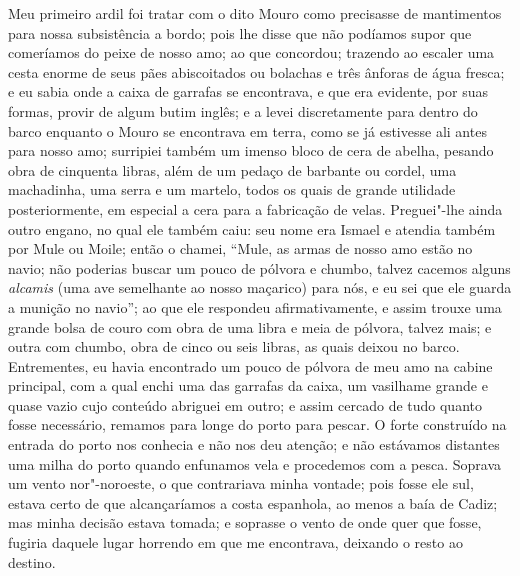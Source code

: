 Meu primeiro ardil foi tratar com o dito Mouro como precisasse de
mantimentos para nossa subsistência a bordo; pois lhe disse que não
podíamos supor que comeríamos do peixe de nosso amo; ao que concordou;
trazendo ao escaler uma cesta enorme de seus pães abiscoitados ou
bolachas e três ânforas de água fresca; e eu sabia onde a caixa de
garrafas se encontrava, e que era evidente, por suas formas, provir de
algum butim inglês; e a levei discretamente para dentro do barco
enquanto o Mouro se encontrava em terra, como se já estivesse ali antes
para nosso amo; surripiei também um imenso bloco de cera de abelha,
pesando obra de cinquenta libras, além de um pedaço de barbante ou
cordel, uma machadinha, uma serra e um martelo, todos os quais de grande
utilidade posteriormente, em especial a cera para a fabricação de velas.
Preguei"-lhe ainda outro engano, no qual ele também caiu: seu nome era
Ismael e atendia também por Mule ou Moile; então o chamei, ``Mule, as
armas de nosso amo estão no navio; não poderias buscar um pouco de
pólvora e chumbo, talvez cacemos alguns \emph{alcamis} (uma ave
semelhante ao nosso maçarico) para nós, e eu sei que ele guarda a
munição no navio''; ao que ele respondeu afirmativamente, e assim trouxe
uma grande bolsa de couro com obra de uma libra e meia de pólvora,
talvez mais; e outra com chumbo, obra de cinco ou seis libras, as quais
deixou no barco. Entrementes, eu havia encontrado um pouco de pólvora de
meu amo na cabine principal, com a qual enchi uma das garrafas da caixa,
um vasilhame grande e quase vazio cujo conteúdo abriguei em outro; e
assim cercado de tudo quanto fosse necessário, remamos para longe do
porto para pescar. O forte construído na entrada do porto nos conhecia e
não nos deu atenção; e não estávamos distantes uma milha do porto quando
enfunamos vela e procedemos com a pesca. Soprava um vento nor"-noroeste,
o que contrariava minha vontade; pois fosse ele sul, estava certo de que
alcançaríamos a costa espanhola, ao menos a baía de Cadiz; mas minha
decisão estava tomada; e soprasse o vento de onde quer que fosse,
fugiria daquele lugar horrendo em que me encontrava, deixando o resto ao
destino.

